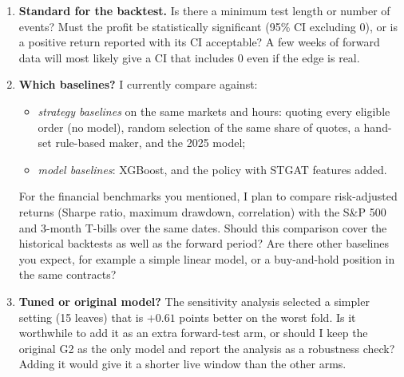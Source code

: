 \documentclass[11pt,a4paper]{article}
\begin{document}
\begin{enumerate}
\begin{itemize}
                This tests G2's training recipe rather than the exact deployed model, whose training data include
                these months;
          \item \emph{forward period:} the deployed G2 (trained to Aug 2026, validated 7 Sep -- 4 Oct 2026) on the
                live weeks to 11 November (interim cut 28 October). This is the only data G2 itself has not seen.
        \end{itemize}
        Is this appropriate, or would you prefer one long backtest on a single split? Is a historical backtest
        needed at all if the forward-period backtest is the main result? Changing the windows is cheapest now; some
        test months have already been scored once, and reusing them in a new split would have to be disclosed.
  \item \textbf{Standard for the backtest.} Is there a minimum test length or number of events? Must the profit be
        statistically significant (95\% CI excluding 0), or is a positive return reported with its CI acceptable?
        A few weeks of forward data will most likely give a CI that includes 0 even if the edge is real.
  \item \textbf{Which baselines?} I currently compare against:
        \begin{itemize}
          \item \emph{strategy baselines} on the same markets and hours: quoting every eligible order (no model),
                random selection of the same share of quotes, a hand-set rule-based maker, and the 2025 model;
          \item \emph{model baselines}: XGBoost, and the policy with STGAT features added.
        \end{itemize}
        For the financial benchmarks you mentioned, I plan to compare risk-adjusted returns (Sharpe ratio, maximum
        drawdown, correlation) with the S\&P 500 and 3-month T-bills over the same dates. Should this comparison
        cover the historical backtests as well as the forward period? Are there other baselines you expect, for
        example a simple linear model, or a buy-and-hold position in the same contracts?
  \item \textbf{Tuned or original model?} The sensitivity analysis selected a simpler setting (15 leaves) that is
        $+0.61$ points better on the worst fold. Is it worthwhile to add it as an extra forward-test arm, or should
        I keep the original G2 as the only model and report the analysis as a robustness check? Adding it would
        give it a shorter live window than the other arms.
\end{enumerate}
\end{document}
